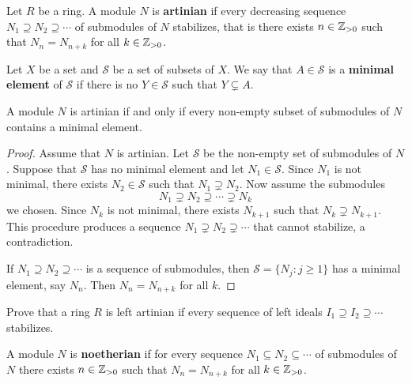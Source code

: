 \chapter{}


\begin{definition}
	Let $R$ be a ring. A module $N$ is \textbf{artinian} if every decreasing sequence 
	$N_1\supseteq N_2\supseteq\cdots$ of submodules of $N$ stabilizes, that is
	there exists $n\in\mathbb{Z}_{>0}$ such that 
	$N_n=N_{n+k}$ for all $k\in\mathbb{Z}_{>0}$.
\end{definition}

Let $X$ be a set and $\mathcal{S}$ be a set of subsets of $X$. 
We say that $A\in\mathcal{S}$ is a \textbf{minimal element} of $\mathcal{S}$
if there is no $Y\in\mathcal{S}$ such that $Y\subsetneq A$. 

\begin{proposition}
\label{pro:artinian_minimal}
	A module $N$ is artinian if and only if 
	every non-empty subset of submodules of $N$ 
	contains a minimal element. 
\end{proposition}

\begin{proof}
	Assume that $N$ is artinian. Let $\mathcal{S}$ be the non-empty set of submodules of $N$. 
	Suppose that $\mathcal{S}$ has no minimal element and let $N_1\in\mathcal{S}$. 
	Since $N_1$ is not minimal, there exists 
	$N_2\in\mathcal{S}$ such that $N_1\supsetneq N_2$. Now assume the 
	submodules 
	\[
	N_1\supsetneq N_2\supseteq\cdots\supsetneq N_k
	\]
	we chosen. 
	Since $N_k$ is not minimal, there exists $N_{k+1}$ such that $N_k\supsetneq N_{k+1}$.
	This procedure produces a sequence $N_1\supsetneq
	N_2\supsetneq\cdots$ that cannot stabilize, a contradiction. 
	
	If $N_1\supseteq N_2\supseteq\cdots$ is a sequence of submodules, then 
	$\mathcal{S}=\{N_j:j\geq1\}$ has a minimal element, say $N_n$. Then
	$N_n=N_{n+k}$ for all $k$. 
\end{proof}

\begin{exercise}
    Prove that a ring $R$ is left artinian if every sequence of 
    left ideals $I_1\supseteq I_2\supseteq\cdots$ stabilizes. 
\end{exercise}

A module $N$ is \textbf{noetherian} if for every sequence 
$N_1\subseteq N_2\subseteq\cdots$ of submodules of $N$ there exists $n\in\mathbb{Z}_{>0}$ such that 
$N_n=N_{n+k}$ for all $k\in\mathbb{Z}_{>0}$. 

